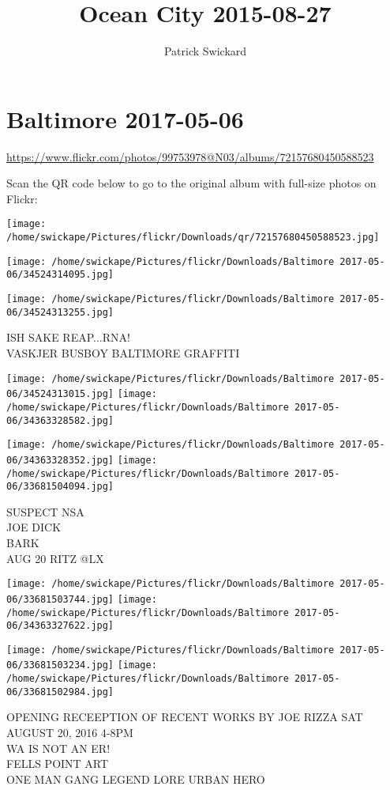 \documentclass[10pt,letterpaper]{article}
\title{Ocean City 2015-08-27}
\author{Patrick Swickard}
\date{}
\begin{document}
\section*{Baltimore 2017-05-06}

\url{https://www.flickr.com/photos/99753978@N03/albums/72157680450588523}

Scan the QR code below to go to the original album with full-size photos on Flickr:

\texttt{[image: /home/swickape/Pictures/flickr/Downloads/qr/72157680450588523.jpg]}
\pagebreak

\texttt{[image: /home/swickape/Pictures/flickr/Downloads/Baltimore 2017-05-06/34524314095.jpg]}

\vspace{0.25in}
\texttt{[image: /home/swickape/Pictures/flickr/Downloads/Baltimore 2017-05-06/34524313255.jpg]}

ISH SAKE REAP...RNA!\\
VASKJER BUSBOY BALTIMORE GRAFFITI
\pagebreak

\texttt{[image: /home/swickape/Pictures/flickr/Downloads/Baltimore 2017-05-06/34524313015.jpg]}
\texttt{[image: /home/swickape/Pictures/flickr/Downloads/Baltimore 2017-05-06/34363328582.jpg]}

\texttt{[image: /home/swickape/Pictures/flickr/Downloads/Baltimore 2017-05-06/34363328352.jpg]}
\texttt{[image: /home/swickape/Pictures/flickr/Downloads/Baltimore 2017-05-06/33681504094.jpg]}

SUSPECT NSA\\
JOE DICK\\
BARK\\
AUG 20 RITZ @LX
\pagebreak

\texttt{[image: /home/swickape/Pictures/flickr/Downloads/Baltimore 2017-05-06/33681503744.jpg]}
\texttt{[image: /home/swickape/Pictures/flickr/Downloads/Baltimore 2017-05-06/34363327622.jpg]}

\texttt{[image: /home/swickape/Pictures/flickr/Downloads/Baltimore 2017-05-06/33681503234.jpg]}
\texttt{[image: /home/swickape/Pictures/flickr/Downloads/Baltimore 2017-05-06/33681502984.jpg]}

OPENING RECEEPTION OF RECENT WORKS BY JOE RIZZA SAT AUGUST 20, 2016 4{-}8PM\\
WA IS NOT AN ER!\\
FELLS POINT ART\\
ONE MAN GANG LEGEND LORE URBAN HERO
\pagebreak
\end{document}
